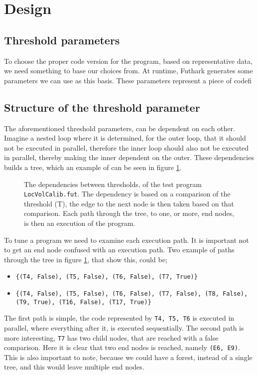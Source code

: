 \section{Design}
\subsection{Threshold parameters}
To choose the proper code version for the program, based on representative data, we need something to base our choices from. At runtime, Futhark generates some parameters we can use as this basis. These parameters represent a piece of codefi

\subsection{Structure of the threshold parameter}
The aforementioned threshold parameters, can be dependent on each other. Imagine a nested loop where it is determined, for the outer loop, that it should not be executed in parallel, therefore the inner loop should also not be executed in parallel, thereby making the inner dependent on the outer. These dependencies builds a tree, which an example of can be seen in figure \ref{LocVolCalibTree}.
\begin{figure}[H]
\centering

\caption{The dependencies between thresholds, of the test program \texttt{LocVolCalib.fut}. The dependency is based on a comparison of the threshold (T), the edge to the next node is then taken based on that comparison. Each path through the tree, to one, or more, end nodes, is then an execution of the program.}
\label{LocVolCalibTree}
\end{figure}
\noindent To tune a program we need to examine each execution path. It is important not to get an end node confused with an execution path. Two example of paths through the tree in figure \ref{LocVolCalibTree}, that show this, could be;
\begin{itemize}
\item \texttt{\{(T4, False), (T5, False), (T6, False), (T7, True)\}}
\item \texttt{\{(T4, False), (T5, False), (T6, False), (T7, False), (T8, False), (T9, True), (T16, False), (T17, True)\}}
\end{itemize} 
The first path is simple, the code represented by \texttt{T4, T5, T6} is executed in parallel, where everything after it, is executed sequentially. The second path is more interesting, \texttt{T7} has two child nodes, that are reached with a false comparison. Here it is clear that two end nodes is reached, namely \texttt{(E6, E9)}. This is also important to note, because we could have a forest, instead of a single tree, and this would leave multiple end nodes.